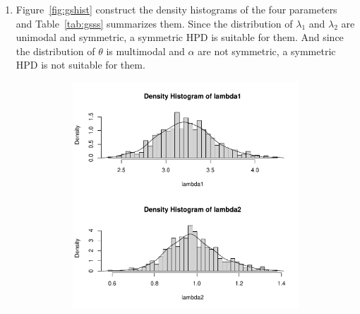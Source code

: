 \documentclass[11pt]{article}
\begin{document}
\begin{enumerate}
    \item Figure~\ref{fig:gshist} construct the density histograms of the four parameters and Table~\ref{tab:gsss} summarizes them. Since the distribution of $\lambda_1$ and $\lambda_2$ are  unimodal and symmetric, a symmetric HPD is suitable for them. And since the distribution of $\theta$ is multimodal and $\alpha$ are not symmetric, a symmetric HPD is not suitable for them.
    \begin{figure}[!htb]
        \begin{subfigure}[t]{0.49\textwidth}
            \centering
            \includegraphics[width=\linewidth]{img/gshist-1.pdf}
        \end{subfigure}
        \begin{subfigure}[t]{0.49\textwidth}
            \centering

\end{subfigure}
\end{figure}
\end{enumerate}
\end{document}
